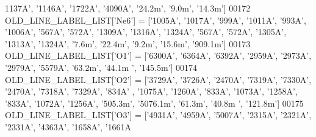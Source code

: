 \begin{DoxyCode}
{{{      1137A'}, \textcolor{stringliteral}{'1146A'}, \textcolor{stringliteral}{'1722A'}, \textcolor{stringliteral}{'4090A'}, \textcolor{stringliteral}{'24.2m'}, \textcolor{stringliteral}{'9.0m'}, \textcolor{stringliteral}{'14.3m'}]
00172 OLD\_LINE\_LABEL\_LIST[\textcolor{stringliteral}{'Ne6'}] = [\textcolor{stringliteral}{'1005A'}, \textcolor{stringliteral}{'1017A'}, \textcolor{stringliteral}{'999A'}, \textcolor{stringliteral}{'1011A'}, \textcolor{stringliteral}{'993A'}, \textcolor{stringliteral}{'1006A'}, \textcolor{stringliteral}{'567A'}, \textcolor{stringliteral}{'572A'}, \textcolor{stringliteral}{'1309A'}, \textcolor{stringliteral}{
      '1316A'}, \textcolor{stringliteral}{'1324A'}, \textcolor{stringliteral}{'567A'}, \textcolor{stringliteral}{'572A'}, \textcolor{stringliteral}{'1305A'}, \textcolor{stringliteral}{'1313A'}, \textcolor{stringliteral}{'1324A'}, \textcolor{stringliteral}{'7.6m'}, \textcolor{stringliteral}{'22.4m'}, \textcolor{stringliteral}{'9.2m'}, \textcolor{stringliteral}{'15.6m'}, \textcolor{stringliteral}{'909.1m'}]
00173 OLD\_LINE\_LABEL\_LIST[\textcolor{stringliteral}{'O1'}] = [\textcolor{stringliteral}{'6300A'}, \textcolor{stringliteral}{'6364A'}, \textcolor{stringliteral}{'6392A'}, \textcolor{stringliteral}{'2959A'}, \textcolor{stringliteral}{'2973A'}, \textcolor{stringliteral}{'2979A'}, \textcolor{stringliteral}{'5579A'}, \textcolor{stringliteral}{'63.2m'}, \textcolor{stringliteral}{'44.1m
      '}, \textcolor{stringliteral}{'145.5m'}]
00174 OLD\_LINE\_LABEL\_LIST[\textcolor{stringliteral}{'O2'}] = [\textcolor{stringliteral}{'3729A'}, \textcolor{stringliteral}{'3726A'}, \textcolor{stringliteral}{'2470A'}, \textcolor{stringliteral}{'7319A'}, \textcolor{stringliteral}{'7330A'}, \textcolor{stringliteral}{'2470A'}, \textcolor{stringliteral}{'7318A'}, \textcolor{stringliteral}{'7329A'}, \textcolor{stringliteral}{'834A'}
      , \textcolor{stringliteral}{'1075A'}, \textcolor{stringliteral}{'1260A'}, \textcolor{stringliteral}{'833A'}, \textcolor{stringliteral}{'1073A'}, \textcolor{stringliteral}{'1258A'}, \textcolor{stringliteral}{'833A'}, \textcolor{stringliteral}{'1072A'}, \textcolor{stringliteral}{'1256A'}, \textcolor{stringliteral}{'505.3m'}, \textcolor{stringliteral}{'5076.1m'}, \textcolor{stringliteral}{'61.3m'}, \textcolor{stringliteral}{'40.8m
      '}, \textcolor{stringliteral}{'121.8m'}]
00175 OLD\_LINE\_LABEL\_LIST[\textcolor{stringliteral}{'O3'}] = [\textcolor{stringliteral}{'4931A'}, \textcolor{stringliteral}{'4959A'}, \textcolor{stringliteral}{'5007A'}, \textcolor{stringliteral}{'2315A'}, \textcolor{stringliteral}{'2321A'}, \textcolor{stringliteral}{'2331A'}, \textcolor{stringliteral}{'4363A'}, \textcolor{stringliteral}{'1658A'}, \textcolor{stringliteral}{'1661A
}}}
\end{DoxyCode}
